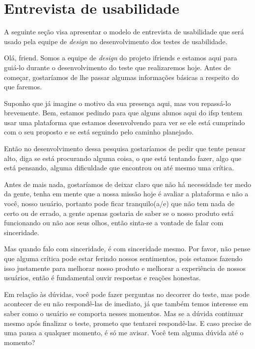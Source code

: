 \chapter{Entrevista de usabilidade}
\label{script_entrevista}

A seguinte seção visa apresentar o modelo de entrevista de usabilidade que será usado pela equipe de \textit{design} no desenvolvimento dos testes de usabilidade. 

Olá, \gls{friend}. Somos a equipe de \textit{design} do projeto \gls{ifriends} e estamos aqui para guiá-lo durante o desenvolvimento do teste que realizaremos hoje. Antes de começar, gostaríamos de lhe passar algumas informações básicas a respeito do que faremos. 

Suponho que já imagine o motivo da sua presença aqui, mas vou repassá-lo brevemente. Bem, estamos pedindo para que alguns alunos aqui do \acs{ifsp} tentem usar uma plataforma que estamos desenvolvendo para ver se ele está cumprindo com o seu proposto e se está seguindo pelo caminho planejado. 

Então no desenvolvimento dessa pesquisa gostaríamos de pedir que tente pensar alto, diga se está procurando alguma coisa, o que está tentando fazer, algo que está pensando, alguma dificuldade que encontrou ou até mesmo uma crítica. 

Antes de mais nada,  gostaríamos de deixar claro que não há necessidade ter medo da gente, tenha em mente que a nossa missão hoje é avaliar a plataforma e não a você, nosso usuário, portanto pode ficar tranquilo(a/e) que não tem nada de certo ou de errado, a gente apenas gostaria de saber se o nosso produto está funcionando ou não aos seus olhos, então sinta-se a vontade de falar com sinceridade.

Mas quando falo com sinceridade, é com sinceridade mesmo. Por favor, não pense que alguma crítica pode estar ferindo nossos sentimentos, pois estamos fazendo isso justamente para melhorar nosso produto e melhorar a experiência de nossos usuários, então é fundamental ouvir respostas e reações honestas. 

Em relação às dúvidas, você pode fazer perguntas no decorrer do teste, mas pode acontecer de eu não respondê-las de imediato, já que também temos interesse em saber como o usuário se comporta nesses momentos.  Mas se a dúvida continuar mesmo após finalizar o teste, prometo que tentarei respondê-las. E caso precise de uma pausa a qualquer momento, é só me avisar. Você tem alguma dúvida até o momento? 

